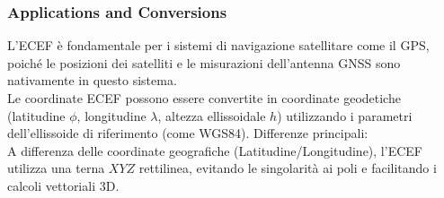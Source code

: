 \documentclass[a4paper,14pt]{article}
\begin{document}
\subsubsection{Applications and Conversions}
L'ECEF è fondamentale per i sistemi di navigazione satellitare come il GPS, poiché le posizioni dei satelliti e le misurazioni dell'antenna GNSS sono nativamente in questo sistema.\\
Le coordinate ECEF possono essere convertite in coordinate geodetiche (latitudine \(\phi \), longitudine \(\lambda \), altezza ellissoidale \(h\)) utilizzando i parametri dell'ellissoide di riferimento (come WGS84).
Differenze principali:\\
A differenza delle coordinate geografiche (Latitudine/Longitudine), l'ECEF utilizza una terna \(XYZ\) rettilinea, evitando le singolarità ai poli e facilitando i calcoli vettoriali 3D.
\end{document}
